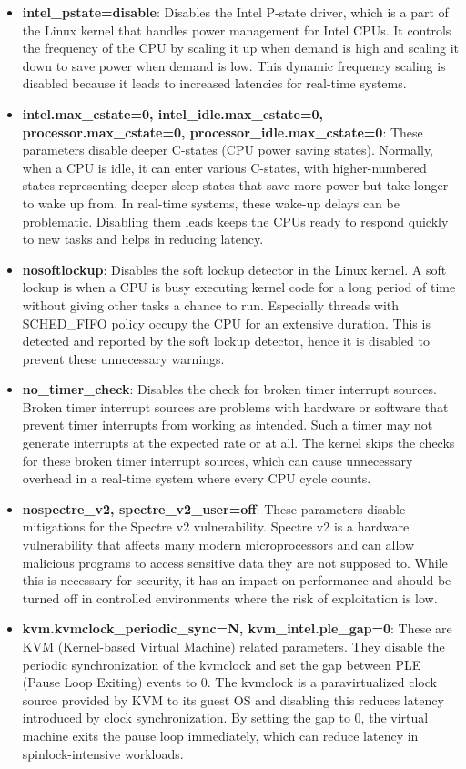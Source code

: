 \documentclass[MMR,Master,english]{twbook}
\begin{document}
\begin{itemize}
	\item \textbf{intel\_pstate=disable}: Disables the Intel P-state driver, which is a part of the Linux kernel that handles power management for Intel CPUs. It controls the frequency of the CPU by scaling it up when demand is high and scaling it down to save power when demand is low. This dynamic frequency scaling is disabled because it leads to increased latencies for real-time systems.
	\item \textbf{intel.max\_cstate=0, intel\_idle.max\_cstate=0, processor.max\_cstate=0, processor\_idle.max\_cstate=0}: These parameters disable deeper C-states (CPU power saving states). Normally, when a CPU is idle, it can enter various C-states, with higher-numbered states representing deeper sleep states that save more power but take longer to wake up from. In real-time systems, these wake-up delays can be problematic. Disabling them leads keeps the CPUs ready to respond quickly to new tasks and helps in reducing latency.
	\item \textbf{nosoftlockup}: Disables the soft lockup detector in the Linux kernel. A soft lockup is when a CPU is busy executing kernel code for a long period of time without giving other tasks a chance to run. Especially threads with SCHED\_FIFO policy occupy the CPU for an extensive duration. This is detected and reported by the soft lockup detector, hence it is disabled to prevent these unnecessary warnings.
	\item \textbf{no\_timer\_check}: Disables the check for broken timer interrupt sources. Broken timer interrupt sources are problems with hardware or software that prevent timer interrupts from working as intended. Such a timer may not generate interrupts at the expected rate or at all. The kernel skips the checks for these broken timer interrupt sources, which can cause unnecessary overhead in a real-time system where every CPU cycle counts.
	\item \textbf{nospectre\_v2, spectre\_v2\_user=off}: These parameters disable mitigations for the Spectre v2 vulnerability. Spectre v2 is a hardware vulnerability that affects many modern microprocessors and can allow malicious programs to access sensitive data they are not supposed to. While this is necessary for security, it has an impact on performance and should be turned off in controlled environments where the risk of exploitation is low.
	\item \textbf{kvm.kvmclock\_periodic\_sync=N, kvm\_intel.ple\_gap=0}: These are KVM (Kernel-based Virtual Machine) related parameters. They disable the periodic synchronization of the kvmclock and set the gap between PLE (Pause Loop Exiting) events to 0. The kvmclock is a paravirtualized clock source provided by KVM to its guest OS and disabling this reduces latency introduced by clock synchronization. By setting the gap to 0, the virtual machine exits the pause loop immediately, which can reduce latency in spinlock-intensive workloads.

\end{itemize}
\end{document}
